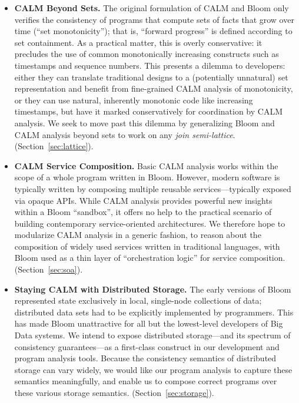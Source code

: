 \begin{itemize}
  \item \textbf{CALM Beyond Sets.}  The original formulation of CALM and Bloom
    only verifies the consistency of programs that compute sets of facts that
    grow over time (``set monotonicity''); that is, ``forward progress'' is
    defined according to set containment. As a practical matter, this is overly
    conservative: it precludes the use of common monotonically increasing constructs such as timestamps and sequence numbers.  This presents a dilemma to developers: either they can translate traditional designs to a (potentially unnatural) set representation and benefit from fine-grained CALM analysis of monotonicity, or they can use natural, inherently monotonic code like increasing timestamps, but have it marked conservatively for coordination by CALM analysis.  We seek to move past this dilemma by generalizing Bloom and CALM analysis beyond sets to work on any \emph{join semi-lattice}.  (Section~\ref{sec:lattice}).

  \item \textbf{CALM Service Composition.}  Basic CALM analysis works within the
    scope of a whole program written in Bloom. However, modern software is
    typically written by composing multiple reusable services---typically
    exposed via opaque APIs. While CALM analysis provides powerful new insights
    within a Bloom ``sandbox'', it offers no help to the practical scenario of
    building contemporary service-oriented architectures.  We therefore hope to
    modularize CALM analysis in a generic fashion, to reason about the
    composition of widely used services written in traditional languages, with Bloom used as a thin layer of ``orchestration logic'' for service composition.  (Section~\ref{sec:soa}).

  \item \textbf{Staying CALM with Distributed Storage.} The early versions of Bloom represented state exclusively in local, single-node collections of data; distributed data sets had to be explicitly implemented by programmers.  This has made Bloom unattractive for all but the lowest-level developers of Big Data systems.  We intend to expose distributed storage---and its spectrum of consistency guarantees---as a first-class construct in our development and program analysis tools.  Because the consistency semantics of distributed storage can vary widely, we would like our program analysis to capture these semantics meaningfully, and enable us to compose correct programs over these various storage semantics.    (Section~\ref{sec:storage}).
  

\end{itemize}
